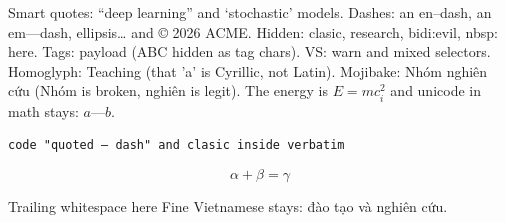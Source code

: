 \documentclass{article}
\begin{document}
Smart quotes: ``deep learning'' and `stochastic' models.
Dashes: an en--dash, an em---dash, ellipsis\ldots{} and \copyright{} 2026 ACME.
Hidden: clasic, research, bidi:evil, nbsp: here.
Tags: payload (ABC hidden as tag chars).
VS: warn and mixed selectors.
Homoglyph: Teaching (that 'a' is Cyrillic, not Latin).
Mojibake: Nhóm nghiên cứu (Nhóm is broken, nghiên is legit).
The energy is $E = mc^2_i$ and unicode in math stays: $a — b$.

\begin{verbatim}
code "quoted — dash" and clasic inside verbatim
\end{verbatim}

\begin{equation}
\alpha + \beta = \gamma
\end{equation}

Trailing whitespace here
Fine Vietnamese stays: đào tạo và nghiên cứu.
\end{document}
